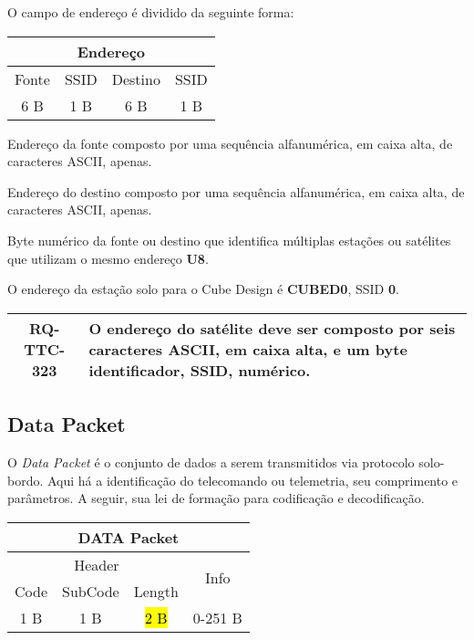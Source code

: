 O campo de endereço é dividido da seguinte forma:

\begin{table}[H]
\centering
\begin{tabular}{|c|c|c|c|}
\hline
\multicolumn{4}{|c|}{Endereço} \\ \hline
Fonte & SSID & Destino & SSID \\ \hline
6 B & 1 B & 6 B & 1 B \\ \hline
\end{tabular}%
\end{table}

\begin{description}[align=right]
    \item[Fonte] Endereço da fonte composto por uma sequência alfanumérica, em caixa alta, de caracteres ASCII, apenas.
    \item[Destino] Endereço do destino composto por uma sequência alfanumérica, em caixa alta, de caracteres ASCII, apenas.
    \item[SSID] Byte numérico da fonte ou destino que identifica múltiplas estações ou satélites que utilizam o mesmo endereço \textbf{U8}.
\end{description}

O endereço da estação solo para o Cube Design é \textbf{CUBED0}, SSID \textbf{0}. 

\begin{table}[H]
    \centering
    \begin{tabular}{|c|p{}|}
        \hline
        \rowcolor{orange}
        \textbf{RQ-TTC-323} & \textbf{O endereço do satélite deve ser composto por seis caracteres ASCII, em caixa alta, e um byte identificador, SSID, numérico.} \\ \hline
    \end{tabular}
    \label{tab:rq-ttc-323}
\end{table}

\subsection{Data Packet}

O \textit{Data Packet} é o conjunto de dados a serem transmitidos via protocolo solo-bordo. Aqui há a identificação do telecomando ou telemetria, seu comprimento e parâmetros.
A seguir, sua lei de formação para codificação e decodificação.

\begin{table}[H]
\centering
\begin{tabular}{|c|c|c|c|}
\hline
\multicolumn{4}{|c|}{DATA Packet} \\ \hline
\multicolumn{3}{|c|}{Header} & \multirow{2}{*}{Info} \\ \cline{1-3}
Code & SubCode & Length & \\ \hline
1 B & 1 B & \hl{2 B} & 0-251 B \\ \hline
\end{tabular}
\end{table}

